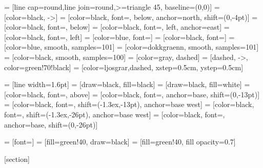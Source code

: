  = [line cap=round,line join=round,>=triangle 45, baseline={(0,0)}]
 = [color=black, ->]
 = [color=black, font=\footnotesize, below, anchor=north, shift={(0,-4pt)}]
 = [color=black, font=\footnotesize, below]
 = [color=black, font=\footnotesize, left, anchor=east]
 = [color=black, font=\footnotesize, left]
 = [color=blue, font=\small]
 = [color=black, font=\footnotesize]
 = [color=blue, smooth, samples=101]
 = [color=dokkgraenn, smooth, samples=101]
 = [color=black, smooth, samples=100]
 = [color=gray, dashed]
 = [dashed, ->, color=green!70!black]
 = [color=ljosgrar,dashed, xstep=0.5cm, ystep=0.5cm]

 = [line width=1.6pt]
 = [draw=black, fill=black]
 = [draw=black, fill=white]
 = [color=black, font=\footnotesize, above]
= [color=black, font=\footnotesize, anchor=base, shift={(0,-13pt)}]
= [color=black, font=\footnotesize, shift={(-1.3ex,-13pt)}, anchor=base west]
= [color=black, font=\footnotesize, shift={(-1.3ex,-26pt)}, anchor=base west]
 = [color=black, font=\footnotesize, anchor=base, shift={(0,-26pt)}]

 = [font=\footnotesize]
 = [fill=green!40, draw=black]
 = [fill=green!40, fill opacity=0.7]

\pagestyle{fancy}

\fancyhfoffset[L]{\hanging}

[section]
\renewcommand{\theregluteljari}{\thesection.\arabic{regluteljari}}

\newenvironment{regla}[1]
{\addtocounter{regluteljari}{-1}\refstepcounter{regluteljari}\par
\begin{tikzpicture}
\tikzstyle{regla}=[fill=reglulitur, text width=\textwidth-4ex, inner sep=2ex]
\node[regla, anchor=north west] (0,0) \bgroup\textbf{Regla \theregluteljari\ #1}\par
}
{\egroup;\end{tikzpicture}\stepcounter{regluteljari}}

